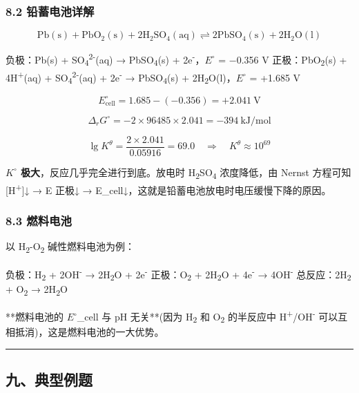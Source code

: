 \subsubsection{8.2 铅蓄电池详解}\label{ux94c5ux84c4ux7535ux6c60ux8be6ux89e3}

\[
\mathrm{Pb(s) + PbO_2(s) + 2H_2SO_4(aq) \rightleftharpoons 2PbSO_4(s) + 2H_2O(l)}
\]

负极：Pb(s) + SO\textsubscript{4}\textsuperscript{2-}(aq) → PbSO\textsubscript{4}(s) + 2e\textsuperscript{-}，\(E^{\circ}\) = −0.356 V
正极：PbO\textsubscript{2}(s) + 4H\textsuperscript{+}(aq) + SO\textsubscript{4}\textsuperscript{2-}(aq) + 2e\textsuperscript{-} → PbSO\textsubscript{4}(s) + 2H\textsubscript{2}O(l)，\(E^{\circ}\) = +1.685 V

\[E^\circ_{\text{cell}} = 1.685 - (-0.356) = +2.041\ \mathrm{V}\]

\[\Delta_rG^\circ = -2 \times 96485 \times 2.041 = -394\ \mathrm{kJ/mol}\]

\[\lg K^\theta = \frac{2 \times 2.041}{0.05916} = 69.0 \quad \Rightarrow \quad K^\theta \approx 10^{69}\]

\textbf{\(K^{\circ}\) 极大}，反应几乎完全进行到底。放电时 H\textsubscript{2}SO\textsubscript{4} 浓度降低，由 Nernst 方程可知 {[}H\textsuperscript{+}{]}↓ → E 正极↓ → E\_cell↓，这就是铅蓄电池放电时电压缓慢下降的原因。

\subsubsection{8.3 燃料电池}\label{ux71c3ux6599ux7535ux6c60}

以 H\textsubscript{2}-O\textsubscript{2} 碱性燃料电池为例：

负极：H\textsubscript{2} + 2OH\textsuperscript{-} → 2H\textsubscript{2}O + 2e\textsuperscript{-}
正极：O\textsubscript{2} + 2H\textsubscript{2}O + 4e\textsuperscript{-} → 4OH\textsuperscript{-}
总反应：2H\textsubscript{2} + O\textsubscript{2} → 2H\textsubscript{2}O

**燃料电池的 \(E^{\circ}\)\_cell 与 pH 无关**(因为 H\textsubscript{2} 和 O\textsubscript{2} 的半反应中 H\textsuperscript{+}/OH\textsuperscript{-} 可以互相抵消)，这是燃料电池的一大优势。

\begin{center}\rule{0.5\linewidth}{0.5pt}\end{center}

\subsection{九、典型例题}\label{ux4e5dux5178ux578bux4f8bux9898}


